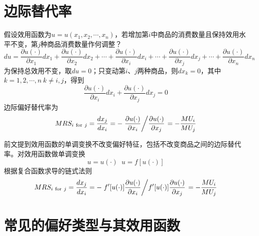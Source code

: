 \section{边际替代率}
\label{sec:marginal-rate-of-substitution}
假设效用函数为$u=u(x_1,x_2,\cdots, x_n)$，若增加第$i$中商品的消费数量且保持效用水平不变，第$j$种商品消费数量作何调整？
\begin{equation}
du = \frac{{\partial u(\cdot)}}{{\partial {x_1}}}d{x_1} + \frac{{\partial u(\cdot)}}{{\partial {x_2}}}d{x_2} +  \cdots  + \frac{{\partial u(\cdot)}}{{\partial {x_i}}}d{x_i} +  \cdots  + \frac{{\partial u(\cdot)}}{{\partial {x_j}}}d{x_j} +  \cdots + \frac{{\partial u(\cdot)}}{{\partial {x_n}}}d{x_n}
\end{equation}
为保持总效用不变，取$du=0$；只变动第$i$、$j$两种商品，则$dx_k=0$，其中$k=1,2,\cdots,n ~ k \ne i,j$，得到
\begin{equation}
\frac{{\partial u(\cdot)}}{{\partial {x_i}}}d{x_i} + \frac{{\partial u(\cdot)}}{{\partial {x_j}}}d{x_j} = 0
\end{equation}
边际偏好替代率为
\begin{equation}
MRS_{{i}~\text{for}~{j}} = \frac{{d{x_j}}}{{d{x_i}}} =  - \left. {\frac{{\partial u(\cdot)}}{{\partial {x_i}}}} \middle/ {\frac{{\partial u(\cdot)}}{{\partial {x_j}}}} \right. = -\frac{MU_i}{MU_j}
\label{eq:marginal-rate-of-substitution}
\end{equation}

前文提到效用函数的单调变换不改变偏好特征，包括不改变商品之间的边际替代率。对效用函数做单调变换
\begin{equation}
u = u(\cdot)\mathop  {\xrightarrow{\text{单调变换}}} u = f[u(\cdot)]
\label{eq:xiaoyong-dandiaobianhuan}
\end{equation}
根据复合函数求导的链式法则
\begin{equation}
MRS_{{i}~\text{for}~{j}} = \frac{{d{x_j}}}{{d{x_i}}}	=  - \left. {f'[u(\cdot)]\frac{{\partial u(\cdot)}}{{\partial {x_i}}}} \middle/ {f'[u(\cdot)]\frac{{\partial u(\cdot)}}{{\partial {x_j}}}} \right. = -\frac{MU_i}{MU_j}
\label{eq:marginal-rate-of-substitution-monly}
\end{equation}

\section{常见的偏好类型与其效用函数}

